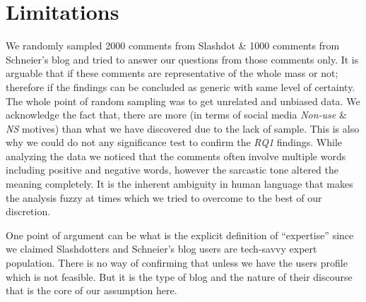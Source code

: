 \section{Limitations}
\label{sec:limitations}
We randomly sampled 2000 comments from Slashdot \& 1000 comments from Schneier's blog and tried to answer our questions from those comments only. It is arguable that if these comments are representative of the whole mass or not; therefore if the findings can be concluded as generic with same level of certainty. The whole point of random sampling was to get unrelated and unbiased data. We acknowledge the fact that, there are more (in terms of social media \emph{Non-use} \& \emph{NS} motives) than what we have discovered due to the lack of sample. This is also why we could do not any significance test to confirm the \textit{RQ1} findings. While analyzing the data we noticed that the comments often involve multiple words including positive and negative words, however the sarcastic tone altered the meaning completely. It is the inherent ambiguity in human language that makes the analysis fuzzy at times which we tried to overcome to the best of our discretion.

One point of argument can be what is the explicit definition of ``expertise'' since we claimed Slashdotters and Schneier's blog users are tech-savvy expert population. There is no way of confirming that unless we have the users profile which is not feasible. But it is the type of blog and the nature of their discourse that is the core of our assumption here. 
